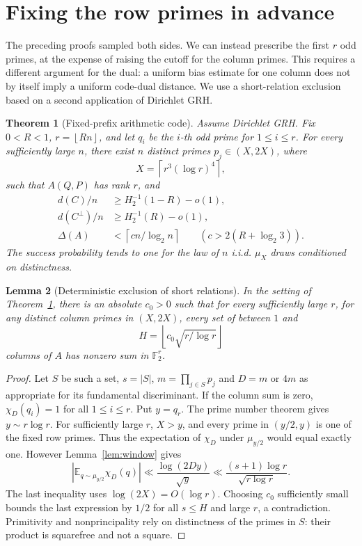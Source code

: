 \documentclass[11pt]{article}
\newtheorem{theorem}{Theorem}[section]
\newtheorem{lemma}[theorem]{Lemma}
\theoremstyle{remark}\newtheorem{remark}[theorem]{Remark}
\newcommand{\F}{\mathbb F_2}
\newcommand{\E}{\mathbb E}
\newcommand{\Hbin}{H_2}
\newcommand{\floor}[1]{\left\lfloor #1\right\rfloor}
\newcommand{\ceil}[1]{\left\lceil #1\right\rceil}
\begin{document}
\section{Fixing the row primes in advance}
The preceding proofs sampled both sides. We can instead prescribe the first $r$ odd primes, at the expense of raising the cutoff for the column primes. This requires a different argument for the dual: a uniform bias estimate for one column does not by itself imply a uniform code-dual distance. We use a short-relation exclusion based on a second application of Dirichlet GRH.
\begin{theorem}[Fixed-prefix arithmetic code]\label{thm:prefix}
Assume Dirichlet GRH. Fix $0<R<1$, $r=\floor{Rn}$, and let $q_i$ be the $i$-th odd prime for $1\le i\le r$. For every sufficiently large $n$, there exist $n$ distinct primes $p_j\in(X,2X)$, where
\[
 X=\ceil{r^3(\log r)^4},
\]
such that $A(Q,P)$ has rank $r$, and
\begin{align*}
 d(C)/n&\ge\Hbin^{-1}(1-R)-o(1),\\
 d(C^\perp)/n&\ge\Hbin^{-1}(R)-o(1),\\
 \Delta(A)&<\ceil{c n/\log_2 n}\qquad(c>2(R+\log_2 3)).
\end{align*}
The success probability tends to one for the law of $n$ i.i.d. $\mu_X$ draws conditioned on distinctness.
\end{theorem}
\begin{lemma}[Deterministic exclusion of short relations]\label{lem:short}
In the setting of Theorem~\ref{thm:prefix}, there is an absolute $c_0>0$ such that for every sufficiently large $r$, for any distinct column primes in $(X,2X)$, every set of between $1$ and
\[
 H=\floor{c_0\sqrt{r/\log r}}
\]
columns of $A$ has nonzero sum in $\F^r$.
\end{lemma}
\begin{proof}
Let $S$ be such a set, $s=|S|$, $m=\prod_{j\in S}p_j$ and $D=m$ or $4m$ as appropriate for its fundamental discriminant. If the column sum is zero, $\chi_D(q_i)=1$ for all $1\le i\le r$. Put $y=q_r$. The prime number theorem gives $y\sim r\log r$. For sufficiently large $r$, $X>y$, and every prime in $(y/2,y)$ is one of the fixed row primes. Thus the expectation of $\chi_D$ under $\mu_{y/2}$ would equal exactly one. However Lemma~\ref{lem:window} gives
\[
 \left|\E_{q\sim\mu_{y/2}}\chi_D(q)\right|
 \ll \frac{\log(2Dy)}{\sqrt y}
 \ll \frac{(s+1)\log r}{\sqrt{r\log r}}.
\]
The last inequality uses $\log(2X)=O(\log r)$. Choosing $c_0$ sufficiently small bounds the last expression by $1/2$ for all $s\le H$ and large $r$, a contradiction. Primitivity and nonprincipality rely on distinctness of the primes in $S$: their product is squarefree and not a square.
\end{proof}
\end{document}
